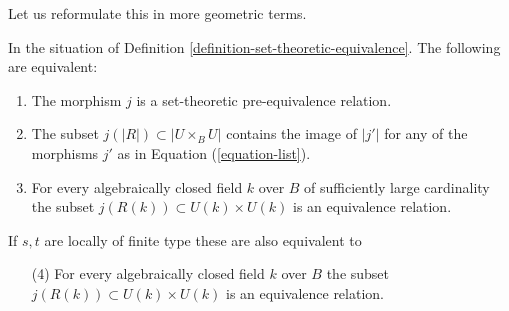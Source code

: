 \noindent
Let us reformulate this in more geometric terms.

\begin{lemma}
\label{lemma-set-theoretic-pre-equivalence-geometric}
In the situation of Definition \ref{definition-set-theoretic-equivalence}.
The following are equivalent:
\begin{enumerate}
\item The morphism $j$ is a set-theoretic pre-equivalence relation.
\item The subset $j(|R|) \subset |U \times_B U|$ contains the image of
$|j'|$ for any of the morphisms $j'$ as in Equation (\ref{equation-list}).
\item For every algebraically closed field $k$ over $B$ of sufficiently large
cardinality the subset $j(R(k)) \subset U(k) \times U(k)$ is an equivalence
relation.
\end{enumerate}
If $s, t$ are locally of finite type these are also equivalent to
\begin{enumerate}
\item[(4)] For every algebraically closed field $k$ over $B$
the subset $j(R(k)) \subset U(k) \times U(k)$ is an equivalence relation.
\end{enumerate}
\end{lemma}


